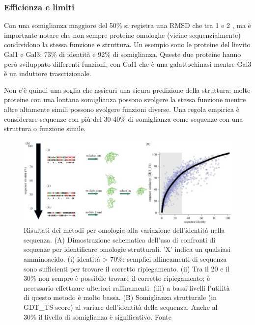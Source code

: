 {\subsubsection{Efficienza e limiti}

Con una somiglianza maggiore del 50\% si registra una RMSD che tra 1 e 2 \angstrom, ma è importante notare che non sempre proteine omologhe (vicine sequenzialmente) condividono la stessa funzione e struttura. Un esempio sono le proteine del lievito Gal1 e Gal3: 73\% di identità e 92\% di somiglianza. Queste due proteine hanno però sviluppato differenti funzioni, con Gal1 che è una galattochinasi mentre Gal3 è un induttore trascrizionale\supercite{platt2000insertion}.

\par Non c'è quindi una soglia che assicuri una sicura predizione della struttura: molte proteine con una lontana somiglianza possono svolgere la stessa funzione mentre altre altamente simili possono svolgere funzioni diverse. Una regola empirica è considerare sequenze con più del 30-40\% di somiglianza come sequenze con una struttura o funzione simile.

\begin{figure}[!htb]
	\centering
	\includegraphics[scale=1.2]{images/homology-grafico.jpg}
	\caption{Risultati dei metodi per omologia alla variazione dell'identità nella sequenza. (A) Dimostrazione schematica dell'uso di confronti di sequenze per identificare omologie strutturali. 'X' indica un qualsiasi amminoacido. (i) identità > 70\%: semplici allineamenti di sequenza sono sufficienti per trovare il corretto ripiegamento. (ii) Tra il 20 e il 30\% non sempre è possibile trovare il corretto ripiegamento; è necessario effettuare ulteriori raffinamenti. (iii) a bassi livelli l'utilità di questo metodo è molto bassa. (B) Somiglianza strutturale (in GDT\_TS score) al variare dell'identità della sequenza. Anche al 30\% il livello di somiglianza è significativo. Fonte\cite{joseph2014local}}
	\label{fig:omologia-grafico}
\end{figure}

}
